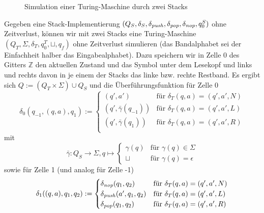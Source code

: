 \documentclass{article}
\begin{document}
\begin{beispiel}
    \begin{figure}[h]
        \centering
        \caption{Simulation einer Turing-Maschine durch zwei Stacks}
    \end{figure}
    Gegeben eine Stack-Implementierung $(Q_S, \delta_S, \delta_{\mathit{push}}, \delta_{\mathit{pop}}, \delta_{\mathit{nop}}, q^S_0)$ ohne Zeitverlust, können wir mit zwei Stacks eine Turing-Maschine $(Q_T, \Sigma, \delta_T, q^T_0, \sqcup, q_f)$ ohne Zeitverlust simulieren (das Bandalphabet sei der Einfachheit halber das Eingabealphabet). Dazu speichern wir in Zelle 0 des Gitters $\mathbb{Z}$ den aktuellen Zustand und das Symbol unter dem Lesekopf und links und rechts davon in je einem der Stacks das linke bzw. rechte Restband. Es ergibt sich $Q := (Q_T \times \Sigma) \cup Q_S$ und die Überführungsfunktion für Zelle 0
    \[ \delta_0(q_{-1}, (q, a), q_1) :=
        \begin{cases}
            (q', a') &\text{für } \delta_T(q, a) = (q', a', N) \\
            (q', \bar\gamma(q_{-1})) &\text{für } \delta_T(q, a) = (q', a', L) \\
            (q', \bar\gamma(q_1)) &\text{für } \delta_T(q, a) = (q', a', R) \\
    \end{cases} \]
    mit
    \[ \bar\gamma : Q_S \rightarrow \Sigma, q \mapsto \begin{cases}
            \gamma(q) &\text{für } \gamma(q) \in \Sigma \\
            \sqcup &\text{für } \gamma(q) = \epsilon
    \end{cases} \]
    sowie für Zelle 1 (und analog für Zelle -1)
    \[ \delta_1((q, a), q_1, q_2) :=
        \begin{cases}
            \delta_{\mathit{nop}}(q_1, q_2) &\text{für } \delta_T(q, a) = (q', a', N) \\
            \delta_{\mathit{push}}(a', q_1, q_2) &\text{für } \delta_T(q, a) = (q', a', L) \\
            \delta_{\mathit{pop}}(q_1, q_2) &\text{für } \delta_T(q, a) = (q', a', R) \\
    \end{cases} \]
\end{beispiel}
\end{document}

